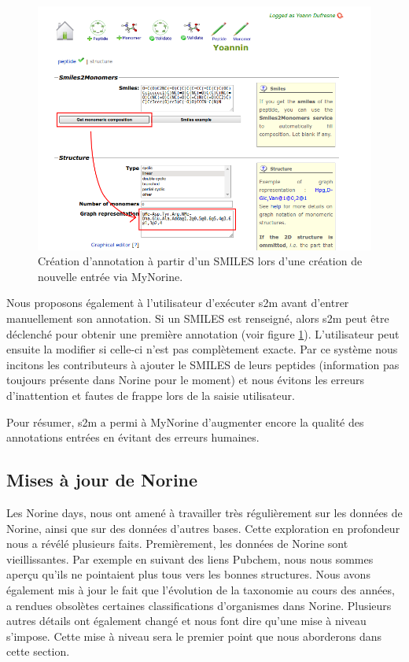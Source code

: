 \begin{figure}[h!]
  \begin{center}
    \includegraphics[width=450px]{Figures/contributions/s2m_automatic.png}
    \caption{\label{s2m_automatic}Création d'annotation à partir d'un SMILES lors d'une création de nouvelle entrée via MyNorine.}
  \end{center}
\end{figure}

Nous proposons également à l'utilisateur d'exécuter s2m avant d'entrer manuellement son annotation.
Si un SMILES est renseigné, alors s2m peut être déclenché pour obtenir une première annotation (voir figure \ref{s2m_automatic}).
L'utilisateur peut ensuite la modifier si celle-ci n'est pas complètement exacte.
Par ce système nous incitons les contributeurs à ajouter le SMILES de leurs peptides (information pas toujours présente dans Norine pour le moment) et nous évitons les erreurs d'inattention et fautes de frappe lors de la saisie utilisateur.

Pour résumer, s2m a permi à MyNorine d'augmenter encore la qualité des annotations entrées en évitant des erreurs humaines.




\subsection{Mises à jour de Norine}

Les Norine days, nous ont amené à travailler très régulièrement sur les données de Norine, ainsi que sur des données d'autres bases.
Cette exploration en profondeur nous a révélé plusieurs faits.
Premièrement, les données de Norine sont vieillissantes.
Par exemple en suivant des liens Pubchem, nous nous sommes aperçu qu'ils ne pointaient plus tous vers les bonnes structures.
Nous avons également mis à jour le fait que l'évolution de la taxonomie au cours des années, a rendues obsolètes certaines classifications d'organismes dans Norine.
Plusieurs autres détails ont également changé et nous font dire qu'une mise à niveau s'impose.
Cette mise à niveau sera le premier point que nous aborderons dans cette section.

